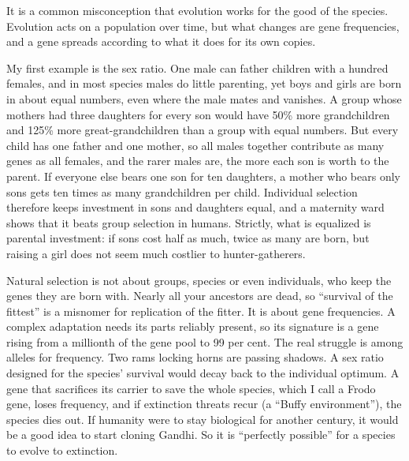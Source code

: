 
It is a common misconception that evolution works for the good of the species. Evolution acts on a population over time, but what changes are gene frequencies, and a gene spreads according to what it does for its own copies. 

My first example is the sex ratio. One male can father children with a hundred females, and in most species males do little parenting, yet boys and girls are born in about equal numbers, even where the male mates and vanishes. A group whose mothers had three daughters for every son would have 50\% more grandchildren and 125\% more great-grandchildren than a group with equal numbers. But every child has one father and one mother, so all males together contribute as many genes as all females, and the rarer males are, the more each son is worth to the parent. If everyone else bears one son for ten daughters, a mother who bears only sons gets ten times as many grandchildren per child. Individual selection therefore keeps investment in sons and daughters equal, and a maternity ward shows that it beats group selection in humans. Strictly, what is equalized is parental investment: if sons cost half as much, twice as many are born, but raising a girl does not seem much costlier to hunter-gatherers. 

Natural selection is not about groups, species or even individuals, who keep the genes they are born with. Nearly all your ancestors are dead, so ``survival of the fittest'' is a misnomer for replication of the fitter. It is about gene frequencies. A complex adaptation needs its parts reliably present, so its signature is a gene rising from a millionth of the gene pool to 99 per cent. The real struggle is among alleles for frequency. Two rams locking horns are passing shadows. A sex ratio designed for the species' survival would decay back to the individual optimum. A gene that sacrifices its carrier to save the whole species, which I call a Frodo gene, loses frequency, and if extinction threats recur (a ``Buffy environment''), the species dies out. If humanity were to stay biological for another century, it would be a good idea to start cloning Gandhi. So it is ``perfectly possible'' for a species to evolve to extinction.

